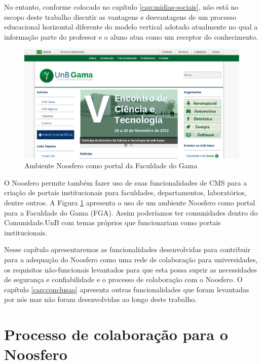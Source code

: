 No entanto, conforme colocado no capítulo \ref{cap:midias-sociais}, não está
no escopo deste trabalho discutir as vantagens e desvantagens de um processo
educacional horizontal diferente do modelo vertical adotado atualmente no qual
a informação parte do professor e o aluno atua como um receptor do conhecimento.

\begin{figure}[h]
	\centering
	\includegraphics[keepaspectratio=true,scale=0.4]
	  {figuras/portal-fga.eps}
	\caption{Ambiente Noosfero como portal da Faculdade do Gama}
	\label{portal-fga}
\end{figure}

O Noosfero permite também fazer uso de suas funcionalidades de CMS para a
criação de portais institucionais para faculdades, departamentos, laboratórios,
dentre outros. A Figura \ref{portal-fga} apresenta o uso de um ambiente
Noosfero como portal para a Faculdade do Gama (FGA). Assim poderíamos ter
comunidades dentro do Comunidade.UnB com temas próprios que funcionariam
como portais institucionais.

Nesse capítulo apresentaremos as funcionalidades desenvolvidas para contribuir
para a adequação do Noosfero como uma rede de colaboração para universidades,
os requisitos não-funcionais levantados para que esta possa suprir as
necessidades de segurança e confiabilidade e o processo de colaboração com o
Noosfero. O capítulo \ref{cap:conclusao} apresenta outras funcionalidades que
foram levantadas por nós mas não foram desenvolvidas ao longo deste trabalho.

\section{Processo de colaboração para o Noosfero}

